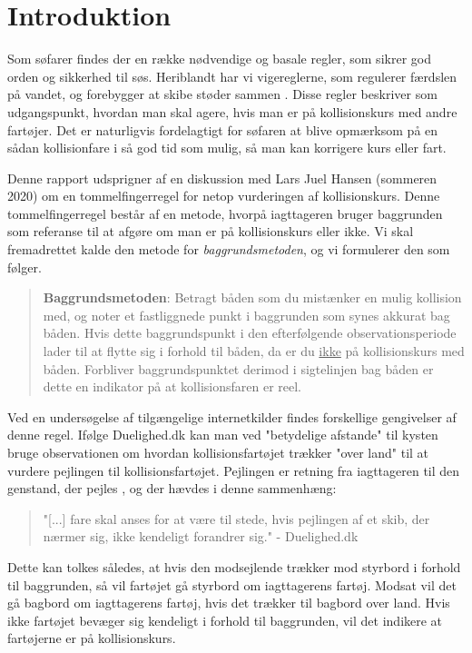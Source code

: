 \documentclass[%
 reprint,
nofootinbib,
aps,
]{revtex4-1}
\begin{document}
\section{Introduktion}
Som søfarer findes der en række nødvendige og basale regler, som sikrer god orden og sikkerhed til søs. Heriblandt har vi vigereglerne, som regulerer færdslen på vandet, og forebygger at skibe støder sammen \cite{respektforvand}. Disse regler beskriver som udgangspunkt, hvordan man skal agere, hvis man er på kollisionskurs med andre fartøjer. Det er naturligvis fordelagtigt for søfaren at blive opmærksom på en sådan kollisionfare i så god tid som mulig, så man kan korrigere kurs eller fart. \par
Denne rapport udsprigner af en diskussion med Lars Juel Hansen (sommeren 2020) om en tommelfingerregel for netop vurderingen af kollisionskurs. Denne tommelfingerregel består af en metode, hvorpå iagttageren bruger baggrunden som referanse til at afgøre om man er på kollisionskurs eller ikke. Vi skal fremadrettet kalde den metode for \textit{baggrundsmetoden}, og vi formulerer den som følger.
\begin{quote}
\textbf{Baggrundsmetoden}: Betragt båden som du mistænker en mulig kollision med, og noter et fastliggnede punkt i baggrunden som synes akkurat bag båden. Hvis dette baggrundspunkt i den efterfølgende observationsperiode lader til at flytte sig i forhold til båden, da er du \underline{ikke} på kollisionskurs med båden. Forbliver baggrundspunktet derimod i sigtelinjen bag båden er dette en indikator på at kollisionsfaren er reel.
\end{quote}
Ved en undersøgelse af tilgængelige internetkilder findes forskellige gengivelser af denne regel. Ifølge Duelighed.dk \cite{duelighed} kan man ved "betydelige afstande" til kysten bruge observationen om hvordan kollisionsfartøjet trækker "over land" til at vurdere pejlingen til kollisionsfartøjet. Pejlingen er retning fra iagttageren til den genstand, der pejles \cite{ordbog}, og der hævdes i denne sammenhæng:
\begin{quote}
   "[...] fare skal anses for at være til stede, hvis pejlingen af et skib, der nærmer sig, ikke kendeligt forandrer sig." - Duelighed.dk \cite{duelighed}
\end{quote}
Dette kan tolkes således, at hvis den modsejlende trækker mod styrbord i forhold til baggrunden, så vil fartøjet gå styrbord om iagttagerens fartøj. Modsat vil det gå bagbord om iagttagerens fartøj, hvis det trækker til bagbord over land. Hvis ikke fartøjet bevæger sig kendeligt i forhold til baggrunden, vil det indikere at fartøjerne er på kollisionskurs. \par
\end{document}
